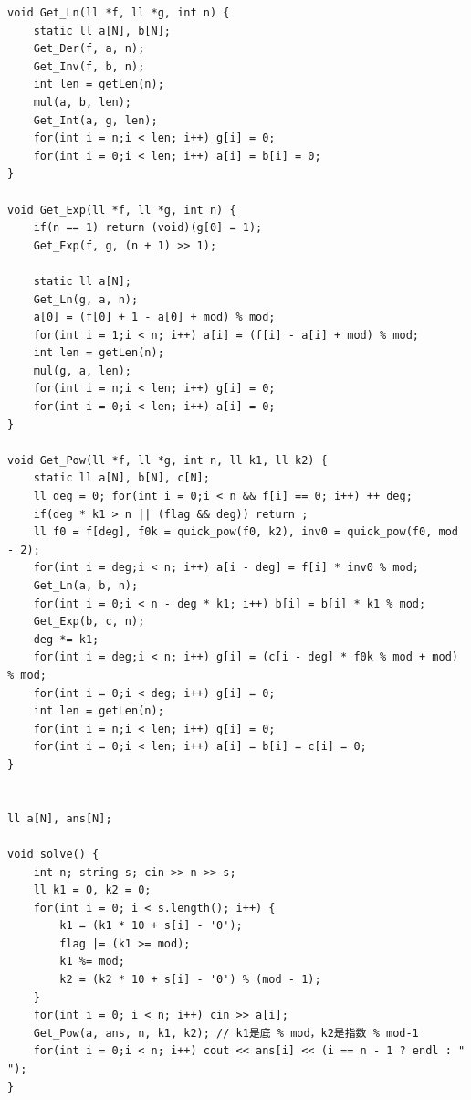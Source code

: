 \documentclass[twoside]{article}
\begin{document}
\begin{lstlisting}
void Get_Ln(ll *f, ll *g, int n) {
    static ll a[N], b[N];
    Get_Der(f, a, n);
    Get_Inv(f, b, n);
    int len = getLen(n);
    mul(a, b, len);
    Get_Int(a, g, len);
    for(int i = n;i < len; i++) g[i] = 0;
    for(int i = 0;i < len; i++) a[i] = b[i] = 0;
}

void Get_Exp(ll *f, ll *g, int n) {
    if(n == 1) return (void)(g[0] = 1);
    Get_Exp(f, g, (n + 1) >> 1);

    static ll a[N];
    Get_Ln(g, a, n);
    a[0] = (f[0] + 1 - a[0] + mod) % mod;
    for(int i = 1;i < n; i++) a[i] = (f[i] - a[i] + mod) % mod;
    int len = getLen(n);
    mul(g, a, len);
    for(int i = n;i < len; i++) g[i] = 0;
    for(int i = 0;i < len; i++) a[i] = 0;
}

void Get_Pow(ll *f, ll *g, int n, ll k1, ll k2) {
    static ll a[N], b[N], c[N];
    ll deg = 0; for(int i = 0;i < n && f[i] == 0; i++) ++ deg;
    if(deg * k1 > n || (flag && deg)) return ;
    ll f0 = f[deg], f0k = quick_pow(f0, k2), inv0 = quick_pow(f0, mod - 2);
    for(int i = deg;i < n; i++) a[i - deg] = f[i] * inv0 % mod;
    Get_Ln(a, b, n);
    for(int i = 0;i < n - deg * k1; i++) b[i] = b[i] * k1 % mod;
    Get_Exp(b, c, n);
    deg *= k1;
    for(int i = deg;i < n; i++) g[i] = (c[i - deg] * f0k % mod + mod) % mod;
    for(int i = 0;i < deg; i++) g[i] = 0;
    int len = getLen(n);
    for(int i = n;i < len; i++) g[i] = 0;
    for(int i = 0;i < len; i++) a[i] = b[i] = c[i] = 0;
}


ll a[N], ans[N];

void solve() {
    int n; string s; cin >> n >> s;
    ll k1 = 0, k2 = 0;
    for(int i = 0; i < s.length(); i++) {
        k1 = (k1 * 10 + s[i] - '0');
        flag |= (k1 >= mod);
        k1 %= mod;
        k2 = (k2 * 10 + s[i] - '0') % (mod - 1);
    }
    for(int i = 0; i < n; i++) cin >> a[i];
    Get_Pow(a, ans, n, k1, k2); // k1是底 % mod，k2是指数 % mod-1
    for(int i = 0;i < n; i++) cout << ans[i] << (i == n - 1 ? endl : " ");
}\end{lstlisting}
\end{document}
